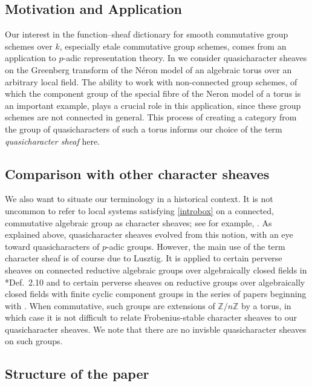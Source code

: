 \documentclass{amsart}
\theoremstyle{plain}
\theoremstyle{definition}
\theoremstyle{remark}
\newcommand{\ZZ}{{\mathbb{Z}}}
\newcommand{\Fq}{k}
\begin{document}
\subsection*{Motivation and Application}

Our interest in the function--sheaf dictionary for smooth commutative group schemes over $\Fq$, especially etale commutative group schemes, comes from an application to $p$-adic representation theory.
In \cite{cunningham-roe:13a} we consider quasicharacter sheaves on the
Greenberg transform of the N\'eron model of an algebraic torus over an arbitrary local field.
The ability to work with non-connected group schemes,
of which the component group of the special fibre of the Neron model of a torus is an important example,
plays a crucial role in this application,
since these group schemes are not connected in general.
This process of creating a category from the group of quasicharacters of such a torus
informs our choice of the term \emph{quasicharacter sheaf} here.

\subsection*{Comparison with other character sheaves}

We also want to situate our terminology in a historical context.
It is not uncommon to refer to local systems satisfying \eqref{introbox} on a connected, commutative algebraic group as character sheaves;
see for example, \cite{kamgarpour:09a}.
As explained above, quasicharacter sheaves evolved from this notion,
with an eye toward quasicharacters of $p$-adic groups.
However, the main use of the term character sheaf is of course due to Lusztig.
It is applied to certain perverse sheaves on connected reductive algebraic groups over algebraically closed fields in
\cite{lusztig:85a}*{Def.~2.10} and to certain perverse sheaves on reductive groups
over algebraically closed fields with finite cyclic component groups in the series of papers
beginning with \cite{lusztig:disconnected1}.
When commutative, such groups are extensions of $\ZZ/n\ZZ$ by a torus,
in which case it is not difficult to relate Frobenius-stable character sheaves to our quasicharacter sheaves.
We note that there are no invisble quasicharacter sheaves on such groups.

\subsection*{Structure of the paper}
\end{document}
